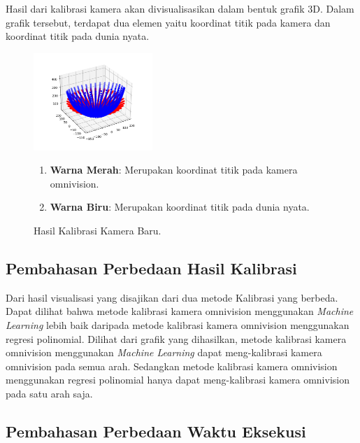 Hasil dari kalibrasi kamera akan divisualisasikan dalam bentuk grafik 3D. Dalam grafik tersebut, terdapat dua elemen yaitu koordinat titik pada kamera dan koordinat titik pada dunia nyata. 
\begin{figure}[ht]
  \centering
  \includegraphics[width=0.4\textwidth]{gambar/hasil_360.png}

  \caption{Hasil Kalibrasi Kamera Baru.}
  \label{fig:hasilkalibrasibaru}
  \begin{enumerate}
    \item \textbf{Warna Merah}: Merupakan koordinat titik pada kamera omnivision. 
    \item \textbf{Warna Biru}: Merupakan koordinat titik pada dunia nyata.
  \end{enumerate}
\end{figure} 

\subsection{Pembahasan Perbedaan Hasil Kalibrasi}
\label{subsec:pembahasanperbedaanhasilkalibrasi}

Dari hasil visualisasi yang disajikan dari dua metode Kalibrasi yang berbeda. Dapat dilihat bahwa metode kalibrasi kamera omnivision menggunakan \emph{Machine Learning} lebih baik daripada metode kalibrasi kamera omnivision menggunakan regresi polinomial. Dilihat dari grafik yang dihasilkan, metode kalibrasi kamera omnivision menggunakan \emph{Machine Learning} dapat meng-kalibrasi kamera omnivision pada semua arah. Sedangkan metode kalibrasi kamera omnivision menggunakan regresi polinomial hanya dapat meng-kalibrasi kamera omnivision pada satu arah saja. 


\subsection{Pembahasan Perbedaan Waktu Eksekusi}
\label{subsec:pembahasanperbedaanwaktu}


